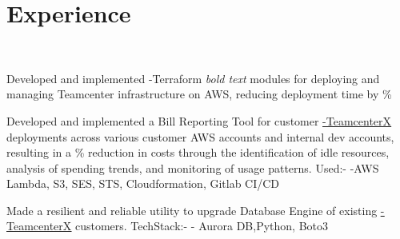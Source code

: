 \documentclass[]{hieudo-build}
\begin{document}
\hfill
\begin{minipage}[t]{0.65\textwidth} 

\section{Experience}
\\
\vspace{0.9em} %
\begin{tightemize}
\item 
Developed and implemented {\makebl -Terraform} \textit{bold text} modules for deploying and managing Teamcenter infrastructure on AWS, reducing deployment time by {\%}
\end{tightemize}
\sectionsep
{}
\vspace{0.9em} %
\begin{tightemize}


\item Developed and implemented a Bill Reporting Tool for customer \href{https://www.plm.automation.siemens.com/global/en/products/teamcenter/cloud-plm.html}{\underline{{\makebl -TeamcenterX}}} deployments across various customer AWS accounts and internal dev accounts, resulting in a {\%} reduction in costs through the identification of idle resources, analysis of spending trends, and monitoring of usage patterns. Used:- {\makebl -AWS Lambda, S3, SES, STS, Cloudformation, Gitlab CI/CD}

\item Made a resilient and reliable utility to upgrade Database Engine of existing \href{https://www.plm.automation.siemens.com/global/en/products/teamcenter/cloud-plm.html}{\underline{{\makebl -TeamcenterX}}} customers.
TechStack:- {\makebl - Aurora DB,Python, Boto3 }

\end{tightemize}
\sectionsep




\end{minipage}
\end{document}
